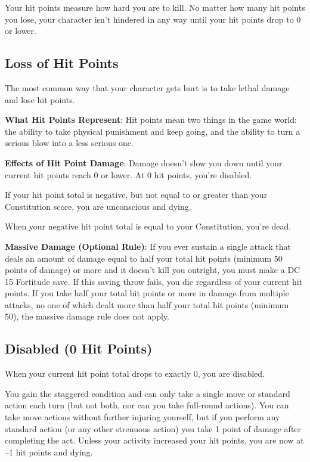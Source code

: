 				
Your hit points measure how hard you are to kill. No matter how many hit points you lose, your character isn't hindered in any way until your hit points drop to 0 or lower.
				
\subsection{Loss of Hit Points}

				
The most common way that your character gets hurt is to take lethal damage and lose hit points.
				
\textbf{What Hit Points Represent}: Hit points mean two things in the game world: the ability to take physical punishment and keep going, and the ability to turn a serious blow into a less serious one.
				
\textbf{Effects of Hit Point Damage}: Damage doesn't slow you down until your current hit points reach 0 or lower. At 0 hit points, you're disabled.
				
If your hit point total is negative, but not equal to or greater than your Constitution score, you are unconscious and dying.
				
When your negative hit point total is equal to your Constitution, you're dead.
				
\textbf{Massive Damage (Optional Rule)}: If you ever sustain a single attack that deals an amount of damage equal to half your total hit points (minimum 50 points of damage) or more and it doesn't kill you outright, you must make a DC 15 Fortitude save. If this saving throw fails, you die regardless of your current hit points. If you take half your total hit points or more in damage from multiple attacks, no one of which dealt more than half your total hit points (minimum 50), the massive damage rule does not apply.
				
\subsection{Disabled (0 Hit Points)}

				
When your current hit point total drops to exactly 0, you are disabled.
				
You gain the staggered condition and can only take a single move or standard action each turn (but not both, nor can you take full-round actions). You can take move actions without further injuring yourself, but if you perform any standard action (or any other strenuous action) you take 1 point of damage after completing the act. Unless your activity increased your hit points, you are now at --1 hit points and dying.
				
